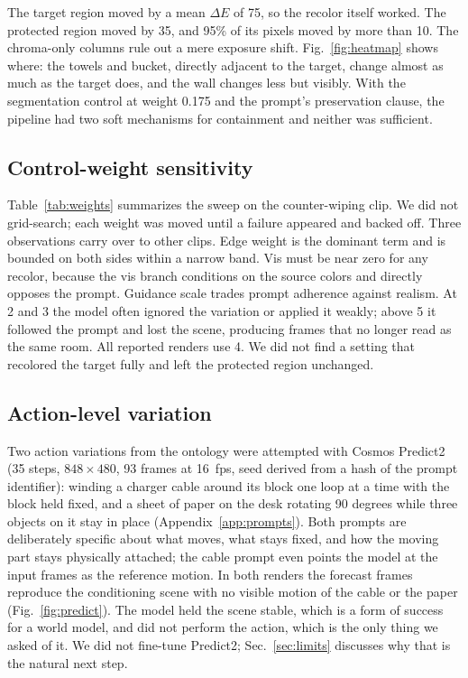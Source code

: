 The target region moved by a mean $\Delta E$ of 75, so the recolor itself worked. The protected region moved by 35, and 95\% of its pixels moved by more than 10. The chroma-only columns rule out a mere exposure shift. Fig.~\ref{fig:heatmap} shows where: the towels and bucket, directly adjacent to the target, change almost as much as the target does, and the wall changes less but visibly. With the segmentation control at weight 0.175 and the prompt's preservation clause, the pipeline had two soft mechanisms for containment and neither was sufficient.

\subsection{Control-weight sensitivity}
Table~\ref{tab:weights} summarizes the sweep on the counter-wiping clip. We did not grid-search; each weight was moved until a failure appeared and backed off. Three observations carry over to other clips. Edge weight is the dominant term and is bounded on both sides within a narrow band. Vis must be near zero for any recolor, because the vis branch conditions on the source colors and directly opposes the prompt. Guidance scale trades prompt adherence against realism. At 2 and 3 the model often ignored the variation or applied it weakly; above 5 it followed the prompt and lost the scene, producing frames that no longer read as the same room. All reported renders use 4. We did not find a setting that recolored the target fully and left the protected region unchanged.

\subsection{Action-level variation}
\label{sec:actionresults}
Two action variations from the ontology were attempted with Cosmos Predict2 (35 steps, $848\times480$, 93 frames at 16~fps, seed derived from a hash of the prompt identifier): winding a charger cable around its block one loop at a time with the block held fixed, and a sheet of paper on the desk rotating 90 degrees while three objects on it stay in place (Appendix~\ref{app:prompts}). Both prompts are deliberately specific about what moves, what stays fixed, and how the moving part stays physically attached; the cable prompt even points the model at the input frames as the reference motion. In both renders the forecast frames reproduce the conditioning scene with no visible motion of the cable or the paper (Fig.~\ref{fig:predict}). The model held the scene stable, which is a form of success for a world model, and did not perform the action, which is the only thing we asked of it. We did not fine-tune Predict2; Sec.~\ref{sec:limits} discusses why that is the natural next step.

